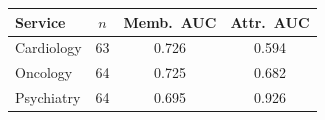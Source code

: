 {\setlength{\tabcolsep}{5pt}\renewcommand{\arraystretch}{1.15}
\begin{tabular}{@{}lccc@{}}
\toprule
Service & $n$ & Memb.\ AUC & Attr.\ AUC \\
\midrule
Cardiology & 63 & 0.726 & 0.594 \\
Oncology   & 64 & 0.725 & 0.682 \\
Psychiatry & 64 & 0.695 & 0.926 \\
\bottomrule
\end{tabular}}
